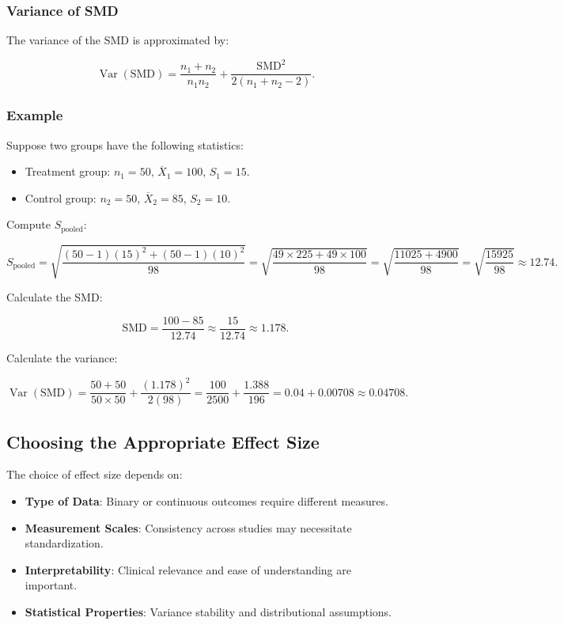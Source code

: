\documentclass[12pt,a4paper]{report}
\newcommand{\Var}{\operatorname{Var}}
\begin{document}
\subsubsection{Variance of SMD}

The variance of the SMD is approximated by:

\begin{equation}
\label{eq:var_smd}
\Var(\text{SMD}) = \frac{n_1 + n_2}{n_1 n_2} + \frac{\text{SMD}^2}{2(n_1 + n_2 - 2)}.
\end{equation}

\subsubsection{Example}
\label{subsubsec:continuous_example}

Suppose two groups have the following statistics:

\begin{itemize}
    \item Treatment group: $n_1 = 50$, $\overline{X}_1 = 100$, $S_1 = 15$.
    \item Control group: $n_2 = 50$, $\overline{X}_2 = 85$, $S_2 = 10$.
\end{itemize}

Compute $S_{\text{pooled}}$:

\[
S_{\text{pooled}} = \sqrt{\frac{(50 - 1)(15)^2 + (50 - 1)(10)^2}{98}} = \sqrt{\frac{49 \times 225 + 49 \times 100}{98}} = \sqrt{\frac{11025 + 4900}{98}} = \sqrt{\frac{15925}{98}} \approx 12.74.
\]

Calculate the SMD:

\[
\text{SMD} = \frac{100 - 85}{12.74} \approx \frac{15}{12.74} \approx 1.178.
\]

Calculate the variance:

\[
\Var(\text{SMD}) = \frac{50 + 50}{50 \times 50} + \frac{(1.178)^2}{2(98)} = \frac{100}{2500} + \frac{1.388}{196} = 0.04 + 0.00708 \approx 0.04708.
\]

\subsection{Choosing the Appropriate Effect Size}
\label{subsec:choosing_effect_size}

The choice of effect size depends on:

\begin{itemize}
    \item \textbf{Type of Data}: Binary or continuous outcomes require different measures.
    \item \textbf{Measurement Scales}: Consistency across studies may necessitate standardization.
    \item \textbf{Interpretability}: Clinical relevance and ease of understanding are important.
    \item \textbf{Statistical Properties}: Variance stability and distributional assumptions.
\end{itemize}
\end{document}
